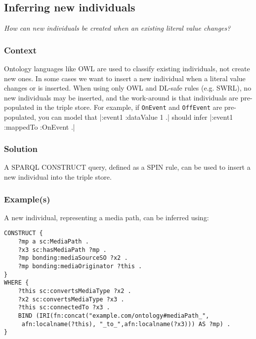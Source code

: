 \subsection{Inferring new individuals}

\emph{How can new individuals be created when an existing literal value changes?}

\subsubsection{Context}

Ontology languages like \ac{OWL} are used to classify existing individuals, not create new ones. In some cases we want to insert a new individual when a literal value changes or is inserted. When using only \ac{OWL} and DL-safe rules (e.g. \ac{SWRL}), no new individuals may be inserted, and the work-around is that individuals are pre-populated in the triple store. For example, if \texttt{OnEvent} and \texttt{OffEvent} are pre-populated, you can model that |:event1 :dataValue 1 .| should infer |:event1 :mappedTo :OnEvent .|

\subsubsection{Solution}

A \ac{SPARQL} CONSTRUCT query, defined as a \ac{SPIN} rule, can be used to insert a new individual into the triple store.
 
\subsubsection{Example(s)}

A new individual, representing a media path, can be inferred using:

\begin{verbatim} 
CONSTRUCT {
    ?mp a sc:MediaPath .
    ?x3 sc:hasMediaPath ?mp .
    ?mp bonding:mediaSourceSO ?x2 .
    ?mp bonding:mediaOriginator ?this .
}
WHERE {
    ?this sc:convertsMediaType ?x2 .
    ?x2 sc:convertsMediaType ?x3 .
    ?this sc:connectedTo ?x3 .
    BIND (IRI(fn:concat("example.com/ontology#mediaPath_", 
     afn:localname(?this), "_to_",afn:localname(?x3))) AS ?mp) .
}
\end{verbatim}

